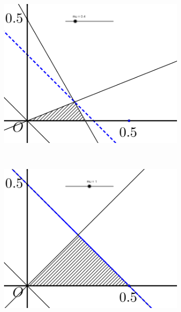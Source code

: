 \documentclass[11pt]{article}
\begin{document}
\begin{figure}[t]
	\centering
	\begin{subfigure}[b]{0.3\linewidth}
		\centering\includegraphics[width=\linewidth]{mu04_v3.png}
		\caption{\label{0.4}}
	\end{subfigure}
	~
	\begin{subfigure}[b]{0.3\linewidth}
		\centering\includegraphics[width=\linewidth]{mu10_v3.png}
		\caption{\label{1.0}}
	\end{subfigure}
	~
	\begin{subfigure}[b]{0.3\linewidth}

\end{subfigure}
\end{figure}
\end{document}
